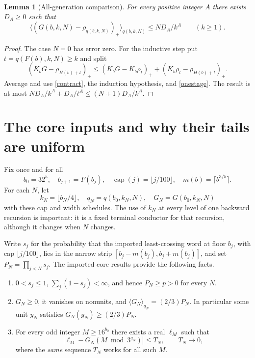 \documentclass[11pt,a4paper]{article}
\newtheorem{lemma}[theorem]{Lemma}
\theoremstyle{definition}\newtheorem{definition}[theorem]{Definition}
\theoremstyle{remark}\newtheorem{remark}[theorem]{Remark}
\newcommand{\av}[2]{\langle #2\rangle_{#1}}
\begin{document}
\begin{lemma}[All-generation comparison]\label{iteration}
For every positive integer $A$ there exists $D_A\ge0$ such that
\[
 \av{q(b,k,N)}{(G(b,k,N)-\rho_{q(b,k,N)})_+}
 \le ND_A/k^A\qquad(k\ge1).
\]
\end{lemma}
\begin{proof}
The case $N=0$ has error zero. For the inductive step put
$t=q(F(b),k,N)\ge k$ and split
\[
 (K_bG-\rho_{H(b)+t})_+
 \le (K_bG-K_b\rho_t)_++(K_b\rho_t-\rho_{H(b)+t})_+.
\]
Average and use \eqref{contract}, the induction hypothesis, and
\eqref{onestage}. The result is at most
$ND_A/k^A+D_A/t^A\le(N+1)D_A/k^A$.
\end{proof}

\section{The core inputs and why their tails are uniform}\label{coreinputs}
Fix once and for all
\[
 b_0=32^5,\quad b_{j+1}=F(b_j),\quad
 \operatorname{cap}(j)=\lfloor j/100\rfloor,\quad m(b)=\lceil b^{3/5}\rceil.
\]
For each $N$, let
\[
 k_N=\lfloor b_N/4\rfloor,\quad q_N=q(b_0,k_N,N),\quad
 G_N=G(b_0,k_N,N)
\]
with these cap and width schedules. The use of $k_N$ at every level of
one backward recursion is important: it is a fixed terminal conductor
for that recursion, although it changes when $N$ changes.

Write $s_j$ for the probability that the imported least-crossing word at
floor $b_j$, with cap $\lfloor j/100\rfloor$, lies in the narrow strip
$[b_j-m(b_j),b_j+m(b_j)]$, and set $P_N=\prod_{j<N}s_j$.
The imported core results provide the following facts.
\begin{enumerate}[label=\textbf{C\arabic*.},leftmargin=34pt]
\item $0<s_j\le1$, $\sum_j(1-s_j)<\infty$, and hence
      $P_N\ge p>0$ for every $N$.
\item $G_N\ge0$, it vanishes on nonunits, and
      $\av{q_N}{G_N}=(2/3)P_N$. In particular some unit $y_N$ satisfies
      $G_N(y_N)\ge(2/3)P_N$.
\item For every odd integer $M\ge16^{b_0}$ there exists a real $\ell_M$
      such that
      \begin{equation}\label{uniformtail}
      |\ell_M-G_N(M\bmod3^{q_N})|\le T_N,\qquad T_N\longrightarrow0,
      \end{equation}
      where the \emph{same} sequence $T_N$ works for all such $M$.
\end{enumerate}
\end{document}
